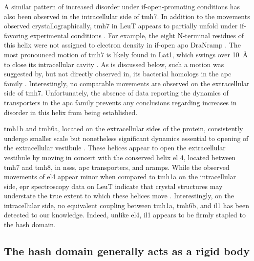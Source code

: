 A similar pattern of increased disorder under \gls{if}-open-promoting conditions has also been observed in the intracellular side of \gls{tmh}7. In addition to the movements observed crystallographically, \gls{tmh}7 in LeuT appears to partially unfold under \gls{if}-favoring experimental conditions \citep*{Merkle2018}. For example, the eight N-terminal residues of this helix were not assigned to electron density in \gls{if}-open apo DraNramp \citep*{Bozzi2019}. The most pronounced motion of \gls{tmh}7 is likely found in Lat1, which swings over \SI{10}{\angstrom} to close its intracellular cavity \citep*{Yan2021}. As is discussed below, such a motion was suggested by, but not directly observed in, its bacterial homologs in the \gls{apc} family \citep*{Errasti-Murugarren2019, Ma2012}. Interestingly, no comparable movements are observed on the extracellular side of \gls{tmh}7. Unfortunately, the absence of data reporting the dynamics of transporters in the \gls{apc} family prevents any conclusions regarding increases in disorder in this helix from being established.

\gls{tmh}1b and \gls{tmh}6a, located on the extracellular sides of the protein, consistently undergo smaller scale but nonetheless significant dynamics essential to opening of the extracellular vestibule \citep*{Singh2008}. These helices appear to open the extracellular vestibule by moving in concert with the conserved helix \gls{el} 4, located between \gls{tmh}7 and \gls{tmh}8, in \gls{nss}s, \gls{apc} transporters, and \gls{nramp}s. While the observed movements of \gls{el}4 appear minor when compared to \gls{tmh}1a on the intracellular side, \gls{epr} spectroscopy data on LeuT indicate that crystal structures may understate the true extent to which these helices move \citep*{Kazmier2014}. Interestingly, on the intracellular side, no equivalent coupling between \gls{tmh}1a, \gls{tmh}6b, and \gls{il}1 has been detected to our knowledge. Indeed, unlike \gls{el}4, \gls{il}1 appears to be firmly stapled to the hash domain.

\subsection{The hash domain generally acts as a rigid body}\label{sec:leutintro_hash}

